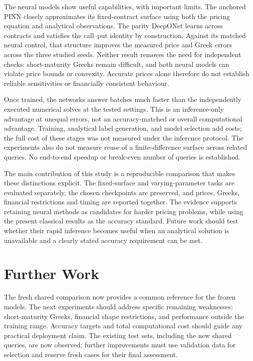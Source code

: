 \documentclass[11pt,a4paper]{article}
\begin{document}
The neural models show useful capabilities, with important limits. The anchored PINN closely approximates its fixed-contract surface using both the pricing equation and analytical observations. The parity DeepONet learns across contracts and satisfies the call--put identity by construction. Against its matched neural control, that structure improves the measured price and Greek errors across the three studied seeds. Neither result removes the need for independent checks: short-maturity Greeks remain difficult, and both neural models can violate price bounds or convexity. Accurate prices alone therefore do not establish reliable sensitivities or financially consistent behaviour.

Once trained, the networks answer batches much faster than the independently executed numerical solves at the tested settings. This is an inference-only advantage at unequal errors, not an accuracy-matched or overall computational advantage. Training, analytical label generation, and model selection add costs; the full cost of these stages was not measured under the inference protocol. The experiments also do not measure reuse of a finite-difference surface across related queries. No end-to-end speedup or break-even number of queries is established.

The main contribution of this study is a reproducible comparison that makes these distinctions explicit. The fixed-surface and varying-parameter tasks are evaluated separately, the chosen checkpoints are preserved, and prices, Greeks, financial restrictions and timing are reported together. The evidence supports retaining neural methods as candidates for harder pricing problems, while using the present classical results as the accuracy standard. Future work should test whether their rapid inference becomes useful when an analytical solution is unavailable and a clearly stated accuracy requirement can be met.

\clearpage
\section{Further Work}
\label{sec:future}
The fresh shared comparison now provides a common reference for the frozen models. The next experiments should address specific remaining weaknesses: short-maturity Greeks, financial shape restrictions, and performance outside the training range. Accuracy targets and total computational cost should guide any practical deployment claim. The existing test sets, including the new shared queries, are now observed; further improvements must use validation data for selection and reserve fresh cases for their final assessment.
\end{document}
